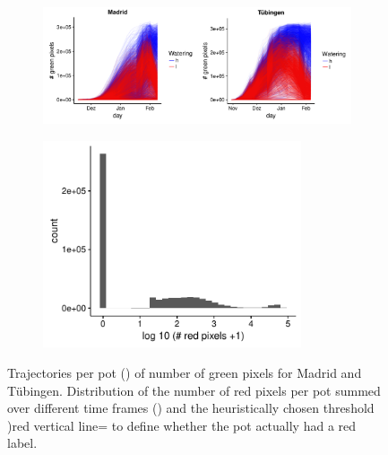\documentclass[12pt,]{article}
\begin{document}
\begin{figure}
    \begin{subfigure}[t]{0.8\textwidth}
        \centerline{\includegraphics[width=6in]{../figs/Figure_green_trajectory.pdf}}
        \caption{} \label{fig:growth}
    \end{subfigure}
        \begin{subfigure}[t]{0.8\textwidth}
        \centerline{\includegraphics[width=3in]{../figs/Figure_redcount_histogram.pdf}}
        \caption{} \label{fig:red}
    \end{subfigure}
    \caption{ Trajectories per pot  () of number of green pixels for Madrid and Tübingen. Distribution of the number of red pixels per pot summed over different time frames () and the heuristically chosen threshold )red vertical line= to define whether the pot actually had a red label.}
    \label{fig:pixels}
\end{figure}
\end{document}

